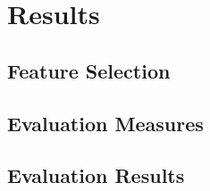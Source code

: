 \chapter{Results}
\label{chap:results}
\section{Feature Selection}
\section{Evaluation Measures}
\section{Evaluation Results}

\newpage




\cleardoublepage

